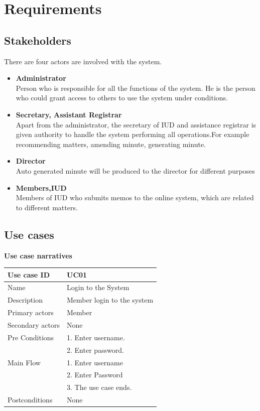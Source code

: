 \documentclass[a4paper,beamer]{article}
\begin{document}
	\section{Requirements}
	
	\subsection{Stakeholders}
	There are four actors are involved with the system.\newline
	
	\begin{itemize}
	\item\textbf{Administrator} \\
		Person who is responsible for all the functions of the system. He is the person who could grant access to others to use the system under conditions.
	\item\textbf{Secretary, Assistant Registrar} \\
		Apart from the administrator, the secretary of IUD and assistance registrar is given authority to handle the system performing all operations.For example recommending matters, amending minute, generating minute.
	\item\textbf{Director}\\
		Auto generated minute will be produced to the director for different purposes 
	\item\textbf{Members,IUD}\\
		Members of IUD who submits memos to the online system, which are related to different matters.
	\end{itemize}
	
	\subsection{Use cases}
	
		\textbf{Use case narratives}\\

		\bgroup
			\def\arraystretch{2}%
		
			\begin{tabular}{|p{4cm}|p{8cm}|} \hline 
					\textbf{Use case ID} & \textbf{UC01}  \\ \hline
					Name & Login to the System \\ \hline 
					Description & Member login to the system \\ \hline 
					Primary actors & Member \\ \hline 
					Secondary actors & None \\ \hline 
					Pre Conditions & 1. Enter username. \\
												& 2. Enter password.\\ \hline 
					Main Flow & 1. Enter username \\
										& 2. Enter Password \\  
										& 3. The use case ends. \\ \hline
					Postconditions & None \\ \hline 
			\end{tabular} \\[.6cm]
			
\end{document}
